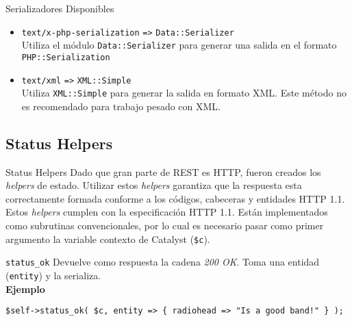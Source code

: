 \begin{frame}{Serializadores Disponibles}
\begin{itemize}
    \item \texttt{text/x-php-serialization} \verb|=>| \texttt{Data::Serializer}\\
    Utiliza el módulo \texttt{Data::Serializer} para generar una salida en el
    formato \texttt{PHP::Serialization}

    \item \texttt{text/xml} \verb|=>| \texttt{XML::Simple} \\

    Utiliza \texttt{XML::Simple} para generar la salida en formato XML. Este
    método no es recomendado para trabajo pesado con XML. 


\end{itemize}

\end{frame}

\subsection{Status Helpers} %

\begin{frame}{Status Helpers} %
    Dado que gran parte de REST es HTTP, fueron creados los \textit{helpers} de
    estado. Utilizar estos \textit{helpers} garantiza que la respuesta esta
    correctamente formada conforme a los códigos, cabeceras y entidades HTTP
    1.1. \\[0.5cm]

    Estos \textit{helpers} cumplen con la especificación HTTP 1.1. Están
    implementados como subrutinas convencionales, por lo cual es necesario
    pasar como primer argumento la variable contexto de Catalyst (\texttt{\$c}).

\end{frame}

\begin{frame}[fragile]{\texttt{status\_ok}} %
    Devuelve como respuesta la cadena \textit{200 OK}. Toma una entidad
    (\texttt{entity}) y la serializa.\\[0.5cm]

    \textbf{Ejemplo}
    \begin{lstlisting}
$self->status_ok( $c, entity => { radiohead => "Is a good band!" } );
    \end{lstlisting}
    
\end{frame}


